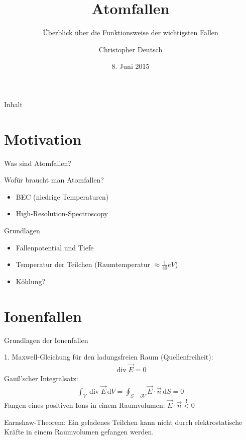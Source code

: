 \documentclass[12pt]{beamer}
\author[Christopher Deutsch]
{Christopher Deutsch}
\title
{Atomfallen}
\subtitle
{Überblick über die Funktionsweise der wichtigsten Fallen}
\institute[]
{Rheinische Friedrich-Wilhelms-Universität Bonn \\
Proseminar Präsentationstechnik SS15}
\date{8. Juni 2015}
\DeclareMathOperator{\divergence}{div}
\begin{document}
\maketitle

\begin{frame}{Inhalt}
	\tableofcontents
\end{frame}


\section{Motivation}

\begin{frame}{Was sind Atomfallen?}
\end{frame}

\begin{frame}{Wofür braucht man Atomfallen?}
	\begin{itemize}
		\item BEC (niedrige Temperaturen)
		\item High-Resolution-Spectroscopy
	\end{itemize}
\end{frame}

\begin{frame}{Grundlagen}
	\begin{itemize}
		\item Fallenpotential und Tiefe
		\item Temperatur der Teilchen (Raumtemperatur $\approx \frac{1}{40} \si{eV}$)
		\item Köhlung?
		
	\end{itemize}
\end{frame}


\section{Ionenfallen}

\begin{frame}{Grundlagen der Ionenfallen}
\end{frame}

\begin{frame}
	1. Maxwell-Gleichung für den ladungsfreien Raum (Quellenfreiheit):
	\begin{align}
	\divergence \vec{E} = 0
	\end{align}
	Gauß'scher Integralsatz:
	\begin{align}
	\int_{V} \divergence \vec{E} \, \mathrm{d}V = \oint_{S = \partial V} \vec{E} \cdot \vec{n} \, \mathrm{d}S = 0
	\end{align}
	Fangen eines positiven Ions in einem Raumvolumen: $\vec{E} \cdot \vec{n} \stackrel{!}{<} 0$
	
	\begin{block}{Earnshaw-Theorem:}
		Ein geladenes Teilchen kann nicht durch elektrostatische Kräfte in einem Raumvolumen gefangen werden.
	\end{block}
\end{frame}
\end{document}
